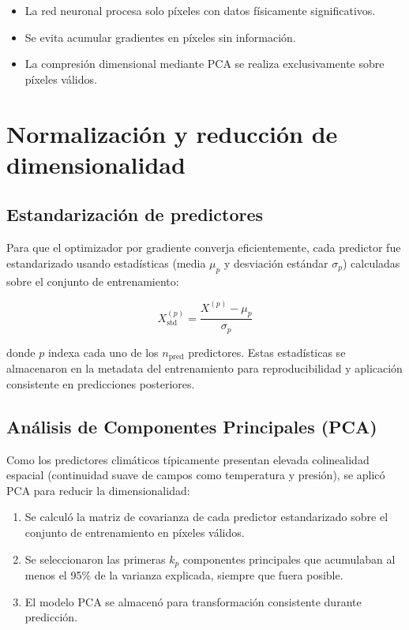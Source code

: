 \begin{itemize}
    \item La red neuronal procesa solo píxeles con datos físicamente significativos.
    \item Se evita acumular gradientes en píxeles sin información.
    \item La compresión dimensional mediante PCA se realiza exclusivamente sobre píxeles válidos.
\end{itemize}

\section{Normalización y reducción de dimensionalidad}
\label{sec:normalizacion_pca}

\subsection{Estandarización de predictores}
Para que el optimizador por gradiente converja eficientemente, cada predictor fue estandarizado usando estadísticas (media $\mu_p$ y desviación estándar $\sigma_p$) calculadas sobre el conjunto de entrenamiento:

\begin{equation}
    X_{\text{std}}^{(p)} = \frac{X^{(p)} - \mu_p}{\sigma_p}
\end{equation}

donde $p$ indexa cada uno de los $n_{\text{pred}}$ predictores. Estas estadísticas se almacenaron en la metadata del entrenamiento para reproducibilidad y aplicación consistente en predicciones posteriores.

\subsection{Análisis de Componentes Principales (PCA)}
Como los predictores climáticos típicamente presentan elevada colinealidad espacial (continuidad suave de campos como temperatura y presión), se aplicó PCA para reducir la dimensionalidad:

\begin{enumerate}
    \item Se calculó la matriz de covarianza de cada predictor estandarizado sobre el conjunto de entrenamiento en píxeles válidos.
    \item Se seleccionaron las primeras $k_p$ componentes principales que acumulaban al menos el 95\% de la varianza explicada, siempre que fuera posible.
    \item El modelo PCA se almacenó para transformación consistente durante predicción.
\end{enumerate}

